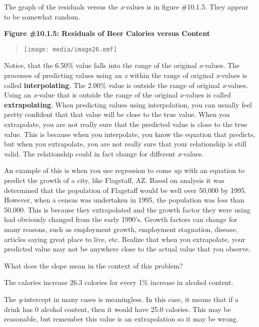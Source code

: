 \documentclass[]{book}
\begin{document}
The graph of the residuals versus the \emph{x}-values is in figure \#10.1.5.
They appear to be somewhat random.

\textbf{Figure \#10.1.5: Residuals of Beer Calories versus Content}

\begin{quote}
\texttt{[image: media/image26.emf]}
\end{quote}

Notice, that the 6.50\% value falls into the range of the original \emph{x}-values. The processes of predicting values using an \emph{x} within the range of original \emph{x}-values is called \textbf{interpolating}. The 2.00\% value is outside the range of original \emph{x}-values. Using an \emph{x}-value that is outside the range of the original \emph{x}-values is called \textbf{extrapolating}. When predicting values using interpolation, you can usually feel pretty confident that that value will be close to the true value. When you extrapolate, you are not really sure that the predicted value is close to the true value. This is because when you interpolate, you know the equation that predicts, but when you extrapolate, you are not really sure that your relationship is still valid. The relationship could in fact change for different \emph{x}-values.

An example of this is when you use regression to come up with an equation to predict the growth of a city, like Flagstaff, AZ. Based on analysis it was determined that the population of Flagstaff would be well over 50,000 by 1995. However, when a census was undertaken in 1995, the population was less than 50,000. This is because they extrapolated and the growth factor they were using had obviously changed from the early 1990's. Growth factors can change for many reasons, such as employment growth, employment stagnation, disease, articles saying great place to live, etc. Realize that when you extrapolate, your predicted value may not be anywhere close to the actual value that you observe.

What does the slope mean in the context of this problem?

The calories increase 26.3 calories for every 1\% increase in alcohol
content.

The \emph{y}-intercept in many cases is meaningless. In this case, it means that if a drink has 0 alcohol content, then it would have 25.0 calories. This may be reasonable, but remember this value is an extrapolation so it may be wrong.
\end{document}

